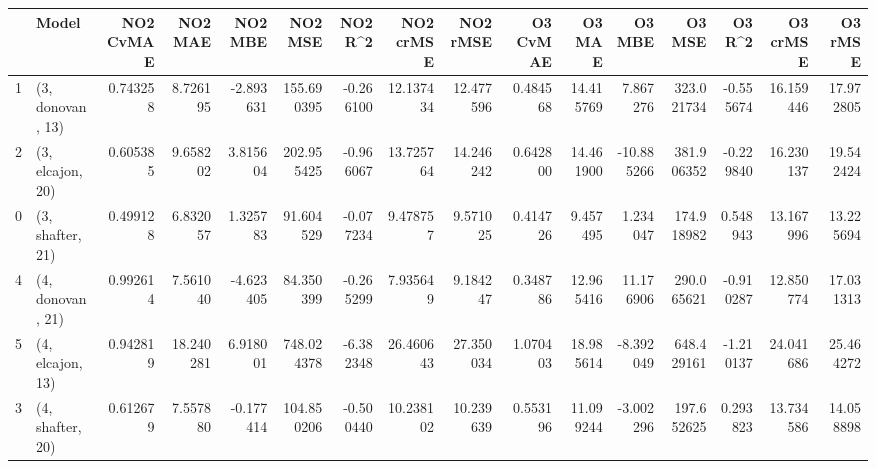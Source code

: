 \begin{tabular}{llrrrrrrrrrrrrrr}
\toprule
{} &             Model &  NO2 CvMAE &    NO2 MAE &   NO2 MBE &     NO2 MSE &   NO2 R\textasciicircum2 &  NO2 crMSE &   NO2 rMSE &  O3 CvMAE &     O3 MAE &     O3 MBE &      O3 MSE &    O3 R\textasciicircum2 &   O3 crMSE &    O3 rMSE \\
\midrule
1 &  (3, donovan, 13) &   0.743258 &   8.726195 & -2.893631 &  155.690395 & -0.266100 &  12.137434 &  12.477596 &  0.484568 &  14.415769 &   7.867276 &  323.021734 & -0.555674 &  16.159446 &  17.972805 \\
2 &  (3, elcajon, 20) &   0.605385 &   9.658202 &  3.815604 &  202.955425 & -0.966067 &  13.725764 &  14.246242 &  0.642800 &  14.461900 & -10.885266 &  381.906352 & -0.229840 &  16.230137 &  19.542424 \\
0 &  (3, shafter, 21) &   0.499128 &   6.832057 &  1.325783 &   91.604529 & -0.077234 &   9.478757 &   9.571025 &  0.414726 &   9.457495 &   1.234047 &  174.918982 &  0.548943 &  13.167996 &  13.225694 \\
4 &  (4, donovan, 21) &   0.992614 &   7.561040 & -4.623405 &   84.350399 & -0.265299 &   7.935649 &   9.184247 &  0.348786 &  12.965416 &  11.176906 &  290.065621 & -0.910287 &  12.850774 &  17.031313 \\
5 &  (4, elcajon, 13) &   0.942819 &  18.240281 &  6.918001 &  748.024378 & -6.382348 &  26.460643 &  27.350034 &  1.070403 &  18.985614 &  -8.392049 &  648.429161 & -1.210137 &  24.041686 &  25.464272 \\
3 &  (4, shafter, 20) &   0.612679 &   7.557880 & -0.177414 &  104.850206 & -0.500440 &  10.238102 &  10.239639 &  0.553196 &  11.099244 &  -3.002296 &  197.652625 &  0.293823 &  13.734586 &  14.058898 \\
\bottomrule
\end{tabular}
